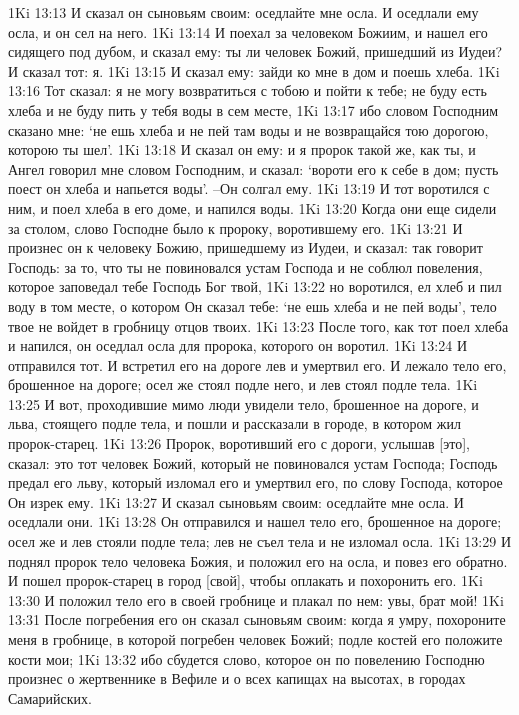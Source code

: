 1Ki 13:13  И сказал он сыновьям своим: оседлайте мне осла. И оседлали ему осла, и он сел на него.
1Ki 13:14  И поехал за человеком Божиим, и нашел его сидящего под дубом, и сказал ему: ты ли человек Божий, пришедший из Иудеи? И сказал тот: я.
1Ki 13:15  И сказал ему: зайди ко мне в дом и поешь хлеба.
1Ki 13:16  Тот сказал: я не могу возвратиться с тобою и пойти к тебе; не буду есть хлеба и не буду пить у тебя воды в сем месте,
1Ki 13:17  ибо словом Господним сказано мне: `не ешь хлеба и не пей там воды и не возвращайся тою дорогою, которою ты шел'.
1Ki 13:18  И сказал он ему: и я пророк такой же, как ты, и Ангел говорил мне словом Господним, и сказал: `вороти его к себе в дом; пусть поест он хлеба и напьется воды'. --Он солгал ему.
1Ki 13:19  И тот воротился с ним, и поел хлеба в его доме, и напился воды.
1Ki 13:20  Когда они еще сидели за столом, слово Господне было к пророку, воротившему его.
1Ki 13:21  И произнес он к человеку Божию, пришедшему из Иудеи, и сказал: так говорит Господь: за то, что ты не повиновался устам Господа и не соблюл повеления, которое заповедал тебе Господь Бог твой,
1Ki 13:22  но воротился, ел хлеб и пил воду в том месте, о котором Он сказал тебе: `не ешь хлеба и не пей воды', тело твое не войдет в гробницу отцов твоих.
1Ki 13:23  После того, как тот поел хлеба и напился, он оседлал осла для пророка, которого он воротил.
1Ki 13:24  И отправился тот. И встретил его на дороге лев и умертвил его. И лежало тело его, брошенное на дороге; осел же стоял подле него, и лев стоял подле тела.
1Ki 13:25  И вот, проходившие мимо люди увидели тело, брошенное на дороге, и льва, стоящего подле тела, и пошли и рассказали в городе, в котором жил пророк-старец.
1Ki 13:26  Пророк, воротивший его с дороги, услышав [это], сказал: это тот человек Божий, который не повиновался устам Господа; Господь предал его льву, который изломал его и умертвил его, по слову Господа, которое Он изрек ему.
1Ki 13:27  И сказал сыновьям своим: оседлайте мне осла. И оседлали они.
1Ki 13:28  Он отправился и нашел тело его, брошенное на дороге; осел же и лев стояли подле тела; лев не съел тела и не изломал осла.
1Ki 13:29  И поднял пророк тело человека Божия, и положил его на осла, и повез его обратно. И пошел пророк-старец в город [свой], чтобы оплакать и похоронить его.
1Ki 13:30  И положил тело его в своей гробнице и плакал по нем: увы, брат мой!
1Ki 13:31  После погребения его он сказал сыновьям своим: когда я умру, похороните меня в гробнице, в которой погребен человек Божий; подле костей его положите кости мои;
1Ki 13:32  ибо сбудется слово, которое он по повелению Господню произнес о жертвеннике в Вефиле и о всех капищах на высотах, в городах Самарийских.
